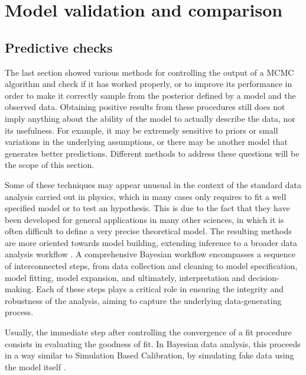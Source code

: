 \section{Model validation and comparison}
\subsection{Predictive checks}
The last section showed various methods for controlling the output of a MCMC algorithm and check if it has worked
properly, or to
improve its performance in order to make it correctly sample from the posterior defined by a model and the observed data.
Obtaining positive results from these procedures still does not imply anything about the ability of the model to actually describe the data, nor its usefulness. For
example, it may be extremely sensitive to priors or small variations in the underlying assumptions, or there may be
another model that generates better predictions. Different methods to address these questions will be the scope of this section.

Some of these techniques may appear unusual in the context of the standard data analysis carried out in physics, which in
many cases only requires to fit a well specified model or to
test an hypothesis. This is due to the fact that they have been developed for general applications in many other
sciences, in which it is often difficult to define a very precise theoretical model. The resulting methods are more
oriented towards model building, extending inference to a broader data analysis workflow \cite{gelman2020bayesian}. A comprehensive Bayesian workflow encompasses a sequence of interconnected
steps, from data collection and cleaning to model specification, model fitting, model expansion, and ultimately,
interpretation and decision-making. Each of these steps plays a critical role in ensuring the integrity and robustness of the analysis, aiming to capture the underlying data-generating process. 


Usually, the immediate step after controlling the convergence of a fit procedure consists in evaluating the goodness of fit.
In Bayesian data analysis, this proceeds in a way similar to Simulation Based Calibration, by simulating fake data using
the model itself \cite{gelman2013bayesian}.

